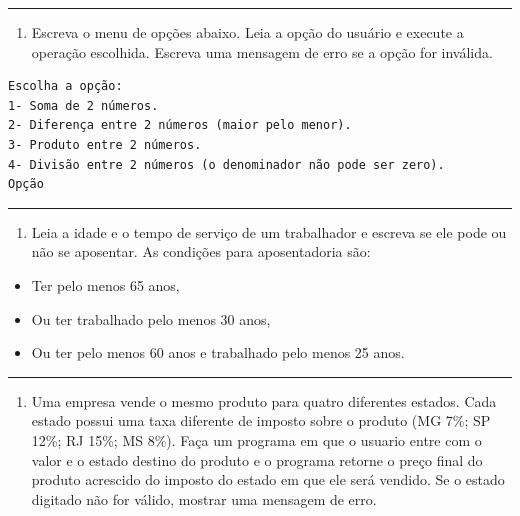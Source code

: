 \documentclass[12pt,a4paper]{article}
\providecommand{\tightlist}{%
      \setlength{\itemsep}{0pt}\setlength{\parskip}{0pt}}
\begin{document}
    \begin{center}\rule{0.5\linewidth}{0.5pt}\end{center}

\begin{enumerate}
\def\labelenumi{\arabic{enumi}.}
\setcounter{enumi}{5}
\tightlist
\item
  Escreva o menu de opções abaixo. Leia a opção do usuário e execute a
  operação escolhida. Escreva uma mensagem de erro se a opção for
  inválida.
\end{enumerate}

\begin{verbatim}
Escolha a opção:
1- Soma de 2 números.
2- Diferença entre 2 números (maior pelo menor).
3- Produto entre 2 números.
4- Divisão entre 2 números (o denominador não pode ser zero).
Opção
\end{verbatim}

    \begin{center}\rule{0.5\linewidth}{0.5pt}\end{center}

\begin{enumerate}
\def\labelenumi{\arabic{enumi}.}
\setcounter{enumi}{6}
\tightlist
\item
  Leia a idade e o tempo de serviço de um trabalhador e escreva se ele
  pode ou não se aposentar. As condições para aposentadoria são:
\end{enumerate}

\begin{itemize}
\tightlist
\item
  Ter pelo menos 65 anos,
\item
  Ou ter trabalhado pelo menos 30 anos,
\item
  Ou ter pelo menos 60 anos e trabalhado pelo menos 25 anos.
\end{itemize}

    \begin{center}\rule{0.5\linewidth}{0.5pt}\end{center}

\begin{enumerate}
\def\labelenumi{\arabic{enumi}.}
\setcounter{enumi}{7}
\tightlist
\item
  Uma empresa vende o mesmo produto para quatro diferentes estados. Cada
  estado possui uma taxa diferente de imposto sobre o produto (MG 7\%;
  SP 12\%; RJ 15\%; MS 8\%). Faça um programa em que o usuario entre com
  o valor e o estado destino do produto e o programa retorne o preço
  final do produto acrescido do imposto do estado em que ele será
  vendido. Se o estado digitado não for válido, mostrar uma mensagem de
  erro.
\end{enumerate}
\end{document}
